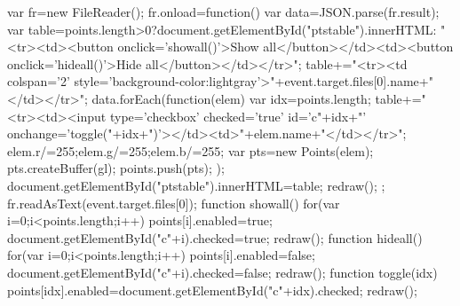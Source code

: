             {
                var fr=new FileReader();
                fr.onload=function(){
                    var data=JSON.parse(fr.result);
                    var table=points.length>0?document.getElementById("ptstable").innerHTML:
                            "<tr><td><button onclick='showall()'>Show all</button></td><td><button onclick='hideall()'>Hide all</button></td></tr>";
                    table+="<tr><td colspan='2' style='background-color:lightgray'>"+event.target.files[0].name+"</td></tr>";
                    data.forEach(function(elem){
                        var idx=points.length;
                        table+="<tr><td><input type='checkbox' checked='true' id='c"+idx+"' onchange='toggle("+idx+")'></td><td>"+elem.name+"</td></tr>";
                        elem.r/=255;elem.g/=255;elem.b/=255;
                        var pts=new Points(elem);
                        pts.createBuffer(gl);
                        points.push(pts);
                    });
                    document.getElementById("ptstable").innerHTML=table;
                    redraw();
                };
                fr.readAsText(event.target.files[0]);
            }
            function showall(){
                for(var i=0;i<points.length;i++){
                    points[i].enabled=true;
                    document.getElementById("c"+i).checked=true;
                }
                redraw();
            }
            function hideall(){
                for(var i=0;i<points.length;i++){
                    points[i].enabled=false;
                    document.getElementById("c"+i).checked=false;
                }
                redraw();
            }
            function toggle(idx){
                points[idx].enabled=document.getElementById("c"+idx).checked;
                redraw();
            }
            
